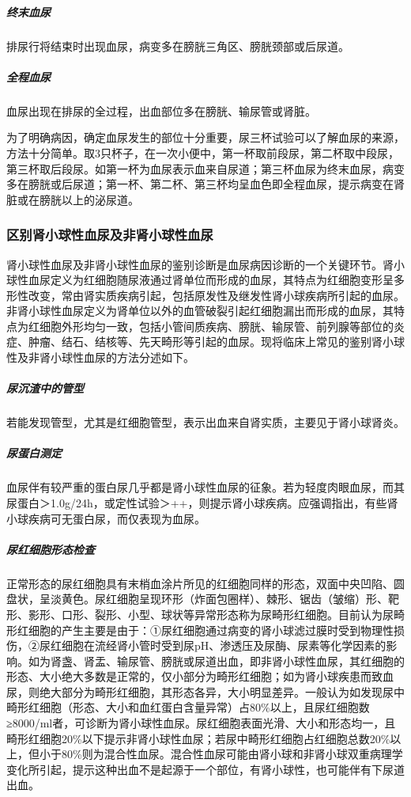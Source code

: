 \subparagraph{终末血尿}

排尿行将结束时出现血尿，病变多在膀胱三角区、膀胱颈部或后尿道。

\subparagraph{全程血尿}

血尿出现在排尿的全过程，出血部位多在膀胱、输尿管或肾脏。

为了明确病因，确定血尿发生的部位十分重要，尿三杯试验可以了解血尿的来源，方法十分简单。取3只杯子，在一次小便中，第一杯取前段尿，第二杯取中段尿，第三杯取后段尿。如第一杯为血尿表示血来自尿道；第三杯血尿为终末血尿，病变多在膀胱或后尿道；第一杯、第二杯、第三杯均呈血色即全程血尿，提示病变在肾脏或在膀胱以上的泌尿道。

\subsubsection{区别肾小球性血尿及非肾小球性血尿}

肾小球性血尿及非肾小球性血尿的鉴别诊断是血尿病因诊断的一个关键环节。肾小球性血尿定义为红细胞随尿液通过肾单位而形成的血尿，其特点为红细胞变形呈多形性改变，常由肾实质疾病引起，包括原发性及继发性肾小球疾病所引起的血尿。非肾小球性血尿定义为肾单位以外的血管破裂引起红细胞漏出而形成的血尿，其特点为红细胞外形均匀一致，包括小管间质疾病、膀胱、输尿管、前列腺等部位的炎症、肿瘤、结石、结核等、先天畸形等引起的血尿。现将临床上常见的鉴别肾小球性及非肾小球性血尿的方法分述如下。

\subparagraph{尿沉渣中的管型}

若能发现管型，尤其是红细胞管型，表示出血来自肾实质，主要见于肾小球肾炎。

\subparagraph{尿蛋白测定}

血尿伴有较严重的蛋白尿几乎都是肾小球性血尿的征象。若为轻度肉眼血尿，而其尿蛋白＞1.0g/24h，或定性试验＞++，则提示肾小球疾病。应强调指出，有些肾小球疾病可无蛋白尿，而仅表现为血尿。

\subparagraph{尿红细胞形态检查}

正常形态的尿红细胞具有末梢血涂片所见的红细胞同样的形态，双面中央凹陷、圆盘状，呈淡黄色。尿红细胞呈现环形（炸面包圈样）、棘形、锯齿（皱缩）形、靶形、影形、口形、裂形、小型、球状等异常形态称为尿畸形红细胞。目前认为尿畸形红细胞的产生主要是由于：①尿红细胞通过病变的肾小球滤过膜时受到物理性损伤，②尿红细胞在流经肾小管时受到尿pH、渗透压及尿酶、尿素等化学因素的影响。如为肾盏、肾盂、输尿管、膀胱或尿道出血，即非肾小球性血尿，其红细胞的形态、大小绝大多数是正常的，仅小部分为畸形红细胞；如为肾小球疾患而致血尿，则绝大部分为畸形红细胞，其形态各异，大小明显差异。一般认为如发现尿中畸形红细胞（形态、大小和血红蛋白含量异常）占80\%以上，且尿红细胞数≥8000/ml者，可诊断为肾小球性血尿。尿红细胞表面光滑、大小和形态均一，且畸形红细胞20\%以下提示非肾小球性血尿；若尿中畸形红细胞占红细胞总数20\%以上，但小于80\%则为混合性血尿。混合性血尿可能由肾小球和非肾小球双重病理学变化所引起，提示这种出血不是起源于一个部位，有肾小球性，也可能伴有下尿道出血。


